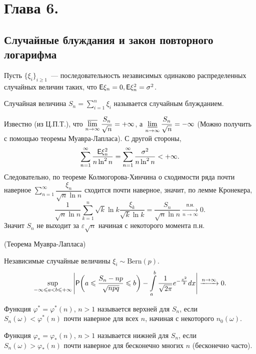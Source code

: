 \section{Глава 6.}
\subsection{Случайные блуждания и закон повторного логарифма}
Пусть $\{ \xi_i\}_{i \geqslant 1}$~--- последовательность независимых одинаково распределенных случайных величин таких, что $\E \xi_n = 0, \E \xi_n^2 = \sigma^2$.
\begin{definition}
Случайная величина $S_n = \sum\limits_{i = 1}^n \xi_i$ называется случайным блужданием.
\end{definition}
Известно (из Ц.П.Т.), что $ \varlimsup\limits_{n \rightarrow \infty} \dfrac{S_n}{\sqrt{n}} = + \infty$, а $ \varliminf\limits_{n \rightarrow \infty} \dfrac{S_n}{\sqrt{n}} = - \infty$ (Можно получить с помощью теоремы Муавра-Лапласа). С другой стороны,
$$ \sum\limits_{n = 1}^\infty \dfrac{\E \xi_n^2}{n \ln^2 n} = \sum\limits_{n = 1}^\infty  \frac{\sigma^2}{n \ln^2 n} < + \infty.$$
Следовательно, по теореме Колмогорова-Хинчина о сходимости ряда почти наверное $\sum\limits_{n = 1}^\infty \dfrac{\xi_n}{\sqrt{n} \ln n}$ сходится почти наверное, значит, по лемме Кронекера, 
$$ \dfrac{1}{\sqrt{n} \ln n} \sum\limits_{k = 1}^n \sqrt{k} \ln k \dfrac{\xi_k}{ \sqrt{k} \ln k} = \dfrac{S_n}{\sqrt{n} \ln n} \xrightarrow[n \rightarrow \infty]{\text{п.н.}} 0.$$ Значит $S_n$ не выходит за $\varepsilon \sqrt{n}$ начиная с некоторого момента п.н.
\begin{theorem} (Теорема Муавра-Лапласа)

    Независимые случайные величины $\xi_i \sim \text{Bern}(p)$. 
    $$\sup_{-\infty \leqslant a < b \leqslant +\infty} \Bigg| \P\bigg( a \leqslant \dfrac{S_n - np}{\sqrt{npq}} \leqslant b \bigg) - \int\limits_a^b \dfrac{1}{\sqrt{2\pi}} e^{-\frac{x^2}{2}}dx \Bigg| \xrightarrow{n \rightarrow \infty} 0.$$
\end{theorem}
\begin{definition}
	Функция $\varphi^* = \varphi^*(n)$, $n > 1$ называется верхней для $S_n$, если $S_n(\omega) < \varphi^*(n)$ почти наверное для всех $n$, начиная с некоторого $n_0(\omega)$.
\end{definition}
\begin{definition}
	Функция $\varphi_* = \varphi_*(n)$, $n > 1$ называется нижней для $S_n$, если $S_n(\omega) > \varphi_*(n)$ почти наверное для бесконечно многих $n$ (бесконечно часто).
\end{definition}
